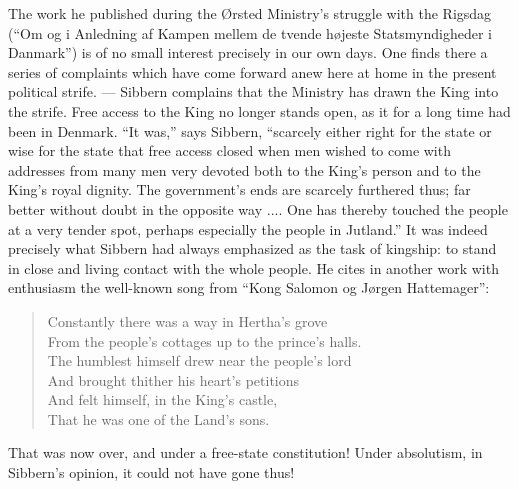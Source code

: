 \documentclass[12pt,a4paper,openany]{book}
\newcommand{\opage}[1]{\marginnote{\footnotesize\textit{[#1]}}}
\begin{document}
The work he published during the Ørsted Ministry's
struggle with the Rigsdag (``Om og i Anledning af Kampen
mellem de tvende højeste Statsmyndigheder i Danmark'') is
of no small interest precisely in our own days. One finds there
a series of complaints which have come forward anew here
at home in the present political strife. --- Sibbern
complains that the Ministry has drawn the King into the strife.
Free access to the King no longer stands open,
as it for a long time had been in Denmark. ``It
was,'' says Sibbern, ``scarcely either right for the state or
wise for the state that free access closed when men wished to come
with addresses from many men very devoted both to the King's person and to the King's
royal dignity. The government's ends
are scarcely furthered thus; far better without doubt in the opposite
way .... One has thereby touched the people at a very tender
spot, perhaps especially the people in Jutland.'' It was indeed precisely what
Sibbern had always emphasized as the task of kingship:
to stand in close and living contact with the whole people. He
cites in another work with enthusiasm the well-known song
from ``Kong Salomon og Jørgen Hattemager'':

\opage{105}
\begin{verse}
Constantly there was a way in Hertha's grove \\
From the people's cottages up to the prince's halls. \\
The humblest himself drew near the people's lord \\
And brought thither his heart's petitions \\
And felt himself, in the King's castle, \\
That he was one of the Land's sons.
\end{verse}

That was now over, and under a free-state constitution! Under
absolutism, in Sibbern's opinion, it could not have gone
thus!
\end{document}
